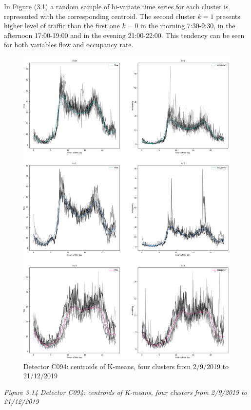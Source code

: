 \documentclass[11pt]{article}
\begin{document}
    In Figure (3.\ref{fig:3.14}) a random sample of bi-variate time series
for each cluster is represented with the corresponding centroid. The
second cluster \(k=1\) presents higher level of traffic than the first
one \(k=0\) in the morning 7:30-9:30, in the afternoon 17:00-19:00 and
in the evening 21:00-22:00. This tendency can be seen for both variables
flow and occupancy rate.

    \begin{figure}
    \centering
    \includegraphics{softDTW centroids K=4 winter 2019.png}
    \caption{Detector C094: centroids of K-means, four clusters from 2/9/2019 to 21/12/2019}
    \label{fig:3.14}
\end{figure}

\emph{\small Figure 3.14 Detector C094: centroids of K-means, four clusters from 2/9/2019 to 21/12/2019}
\end{document}
